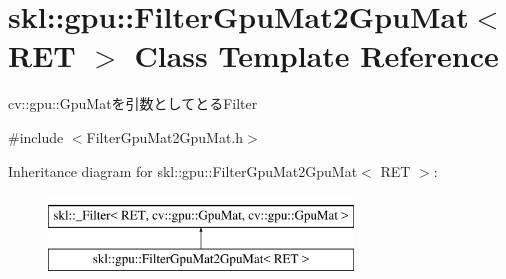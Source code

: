 \hypertarget{classskl_1_1gpu_1_1_filter_gpu_mat2_gpu_mat}{}\section{skl\+:\+:gpu\+:\+:Filter\+Gpu\+Mat2\+Gpu\+Mat$<$ R\+ET $>$ Class Template Reference}
\label{classskl_1_1gpu_1_1_filter_gpu_mat2_gpu_mat}


cv\+::gpu\+::\+Gpu\+Matを引数としてとる\+Filter  




{\ttfamily \#include $<$Filter\+Gpu\+Mat2\+Gpu\+Mat.\+h$>$}

Inheritance diagram for skl\+:\+:gpu\+:\+:Filter\+Gpu\+Mat2\+Gpu\+Mat$<$ R\+ET $>$\+:\begin{figure}[H]
\begin{center}
\leavevmode
\includegraphics[height=2.000000cm]{classskl_1_1gpu_1_1_filter_gpu_mat2_gpu_mat}
\end{center}
\end{figure}

